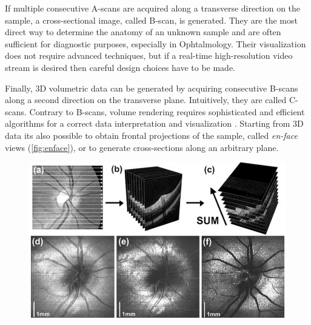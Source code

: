 If multiple consecutive A-scans are acquired along a transverse direction on the sample, a cross-sectional image, called B-scan, is generated. They are the most direct way to determine the anatomy of an unknown sample and are often sufficient for diagnostic purposes, especially in Ophtalmology. Their visualization does not require advanced techniques, but if a real-time high-resolution video stream is desired then careful design choices have to be made. 

Finally, 3D volumetric data can be generated by acquiring consecutive B-scans along a second direction on the transverse plane. Intuitively, they are called C-scans. Contrary to B-scans, volume rendering requires sophisticated and efficient algorithms for a correct data interpretation and visualization \cite{Lacroute1994,Cabral1994,Engel2001}. Starting from 3D data its also possible to obtain frontal projections of the sample, called \emph{en-face} views (\autoref{fig:enface}), or to generate cross-sections along an arbitrary plane.

 \begin{figure}[hbt]
	\myfloatalign
	\includegraphics[width=\linewidth]{gfx/ch2/enface}
	\caption{\cite{Drexler2015}}\label{fig:enface}
\end{figure}

%




